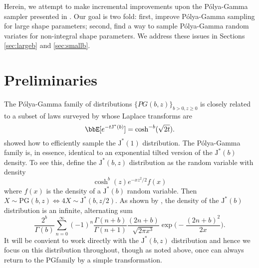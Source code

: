 \documentclass[12pt]{article}
\newcommand{\Polya}{P\'{o}lya}
\newcommand{\JJ}{\text{J}^*}
\newcommand{\PG}{\mbox{PG}}
\begin{document}
Herein, we attempt to make incremental improvements upon the \Polya-Gamma
sampler presented in \cite{polson-etal-2013}.  Our goal is two fold: first,
improve \Polya-Gamma sampling for large shape parameters; second, find a way to
sample \Polya-Gamma random variates for non-integral shape parameters.  We
address these issues in Sections \ref{sec:largeb} and \ref{sec:smallb}.

\section{Preliminaries}

The \Polya-Gamma family of distributions $\{PG(b,z)\}_{b>0, z\geq 0}$ is closely
related to a subset of laws surveyed by \cite{biane-etal-2001} whose Laplace
transforms are 
\[
\bbE[ e^{-t \JJ(b)} ] = \cosh^{-b} (\sqrt{2 t}).
\]
\cite{devroye-2009} showed how to efficiently sample the $\JJ(1)$ distribution.
The \Polya-Gamma family is, in essence, identical to an exponential tilted
version of the $\JJ(b)$ density.  To see this, define the $\JJ(b,z)$
distribution as the random variable with density
\[
\cosh^b(z) e^{- x z^2 / 2} f(x)
\]
where $f(x)$ is the density of a $\JJ(b)$ random variable.  Then $X \sim
\PG(b,z) \iff 4 X \sim \JJ(b,z/2)$.  As shown by \cite{biane-etal-2001}, the
density of the $\JJ(b)$ distribution is an infinite, alternating sum
\begin{equation}
\label{eqn:igamma-rep}
\frac{2^b}{\Gamma(b)} \sum_{n=0}^{\infty} (-1)^n \frac{\Gamma(n+b)}{\Gamma(n+1)} 
\frac{(2n+b)}{\sqrt{2 \pi x^3}} \exp \Big( - \frac{(2n+b)^2}{2 x} \Big).
\end{equation}
It will be convient to work directly with the $\JJ(b,z)$ distribution and hence
we focus on this distribution throughout, though as noted above, once can always
return to the \PG family by a simple transformation.
\end{document}
